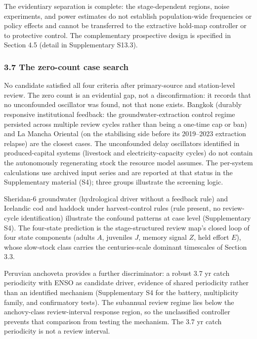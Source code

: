 \documentclass[11pt]{article}
\begin{document}
The evidentiary separation is complete: the stage-dependent regions, noise
experiments, and power estimates do not establish population-wide
frequencies or policy effects and cannot be transferred to the
extractive hold-map controller or to protective control. The complementary prospective design is specified in Section 4.5 (detail in Supplementary S13.3).

\subsubsection{3.7 The zero-count case
search}\label{the-zero-count-case-search}

No candidate satisfied all four criteria after primary-source and station-level review. The zero count is an evidential gap, not a disconfirmation: it records that no unconfounded oscillator was found, not that none exists. Bangkok (durably responsive institutional feedback: the groundwater-extraction control regime persisted across multiple review cycles rather than being a one-time cap or ban) and La Mancha Oriental (on the
stabilising side before its 2019--2023 extraction relapse) are the
closest cases. The unconfounded delay oscillators identified in
produced-capital systems (livestock and electricity-capacity cycles) do
not contain the autonomously regenerating stock the resource model
assumes. The per-system calculations use archived input series and are reported at that status in the
Supplementary material (S4); three groups illustrate the screening logic.

Sheridan-6 groundwater (hydrological driver without a feedback rule) and Icelandic cod and haddock under harvest-control rules (rule present, no review-cycle identification) illustrate the confound patterns at case level (Supplementary S4). The four-state prediction is the stage-structured review map's closed loop of four state components (adults \(A\), juveniles \(J\), memory signal \(Z\), held effort \(E\)), whose slow-stock class carries the centuries-scale dominant timescales of Section 3.3.

Peruvian anchoveta provides a further discriminator: a robust 3.7 yr catch periodicity with ENSO as candidate driver, evidence of shared periodicity rather than an identified mechanism (Supplementary S4 for the battery, multiplicity family, and confirmatory tests). The subannual review regime lies below the anchovy-class review-interval response region, so the unclassified controller prevents that comparison from testing the mechanism. The 3.7 yr catch periodicity is not a review interval.
\end{document}
